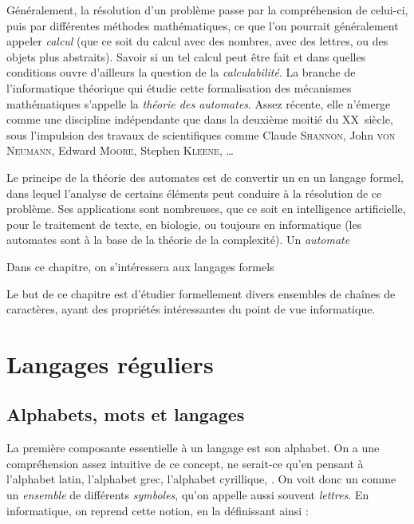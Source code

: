 \documentclass[a4paper,french,bookmarks]{book}
\newcommand{\chaptertoc}[0]{
    \begin{tcolorbox}[
        enhanced,
        frame hidden,
        sharp corners,
        detach title,
        spread outwards     = 5pt,
        halign              = center,
        valign              = center,
        borderline west     = {3pt}{0pt}{main20!50!main2!95!gray!90},
        coltitle            = main20!50!main2!95!gray!90, 
        interior style      = {
            left color      = main1white2!65!gray!11,
            middle color    = main1white2!50!gray!10,
            right color     = main1white2!35!gray!9
        },
        arc                 = 0 cm,
        title               = SOMMAIRE,
        boxrule             = 0pt,
        fonttitle           = \bfseries\sffamily,
        overlay             = {
            \node[rotate=90, minimum width=1cm, anchor=south,yshift=-0.8cm]
            at (frame.west) {\tcbtitle};
        }
    ]
        \begin{minipage}{0.83\linewidth}
            \sffamily
            \minitoc
        \end{minipage}
    \end{tcolorbox}
}
\begin{document}
    Généralement, la résolution d'un problème passe par la compréhension de celui-ci, puis par différentes méthodes mathématiques, ce que l'on pourrait généralement appeler \textit{calcul} (que ce soit du calcul avec des nombres, avec des lettres, ou des objets plus abstraits). Savoir si un tel calcul peut être fait et dans quelles conditions ouvre d'ailleurs la question de la \textit{calculabilité}. La branche de l'informatique théorique qui étudie cette formalisation des mécanismes mathématiques s'appelle la \textit{théorie des automates}. Assez récente, elle n'émerge comme une discipline indépendante que dans la deuxième moitié du \textsc{XX}\ieme~siècle, sous l'impulsion des travaux de scientifiques comme Claude \textsc{Shannon}, John \textsc{von Neumann}, Edward \textsc{Moore}, Stephen \textsc{Kleene}, \dots 
    
    Le principe de la théorie des automates est de convertir un  en un langage formel, dans lequel l'analyse de certains éléments peut conduire à la résolution de ce problème. Ses applications sont nombreuses, que ce soit en intelligence artificielle, pour le traitement de texte, en biologie, ou toujours en informatique (les automates sont à la base de la théorie de la complexité). Un \textit{automate} 
    
    Dans ce chapitre, on s'intéressera aux langages formels 

    Le but de ce chapitre est d'étudier formellement divers ensembles de
    chaînes de caractères, ayant des propriétés intéressantes du point de vue informatique.
    
    \chaptertoc
    
    \section{Langages réguliers}
    
    \subsection{Alphabets, mots et langages}
    
    La première composante essentielle à un langage est son alphabet. On a une compréhension assez intuitive de ce concept, ne serait-ce qu'en pensant à l'alphabet latin, l'alphabet grec, l'alphabet cyrillique, \etc. On voit donc un  comme un \textit{ensemble} de différents \textit{symboles}, qu'on appelle aussi souvent \textit{lettres}. En informatique, on reprend cette notion, en la définissant ainsi :
        
\end{document}

